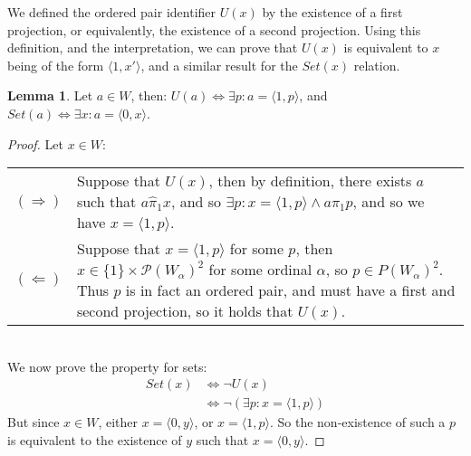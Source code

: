\documentclass[11pt]{report}
\newcommand{\pleft}{\mathrel{\pi_1}}
\newcommand{\pair}[2]{\langle #1,#2 \rangle}
\newcommand{\zpleft}{\mathrel{\widehat{\pi}_1}}
\theoremstyle{definition}
\theoremstyle{theorem}
\theoremstyle{lemma}
\newtheorem{lemma}[theorem]{Lemma}
\begin{document}
We defined the ordered pair identifier $U(x)$ by the existence of a first projection, or equivalently, the existence of a second projection. Using this definition, and the interpretation, we can prove that $U(x)$ is equivalent to $x$ being of the form $\pair{1}{x'}$, and a similar result for the $\mathit{Set}(x)$ relation.
\begin{lemma} Let $a\in W$, then: $U(a) \Leftrightarrow \exists p: a = \pair{1}{p}$, and $Set(a)\Leftrightarrow \exists x: a = \pair{0}{x}$.
  \begin{proof} Let $x\in W$:

    \begin{tabular}{p{7mm} p{133mm}}
      $(\Rightarrow)$\rule{0pt}{5mm} &
      Suppose that $U(x)$, then by definition, there exists $a$ such that $a\zpleft x$, and so $\exists p: x=\pair{1}{p} \wedge a\pleft p$, and so we have $x=\pair{1}{p}$.
      \\
      $(\Leftarrow)$ &\rule{0pt}{5mm}
      Suppose that $x = \pair{1}{p}$ for some $p$, then $x\in\{1\}\times \mathcal{P}(W_\alpha)^2$ for some ordinal $\alpha$, so $p\in P(W_\alpha)^2$.
      Thus $p$ is in fact an ordered pair, and must have a first and second projection, so it holds that $U(x)$.
    \end{tabular}\\

    \noindent
    We now prove the property for sets:
    \begin{align*}
      \mathit{Set}(x) &\iff \neg U(x) \\
                      &\iff \neg (\exists p: x=\pair{1}{p})
    \end{align*}
    But since $x\in W$, either $x = \pair{0}{y}$, or $x = \pair{1}{p}$. So the non-existence of such a $p$ is equivalent to the existence of $y$ such that $x=\pair{0}{y}$.
  \end{proof}
\end{lemma}
\end{document}
